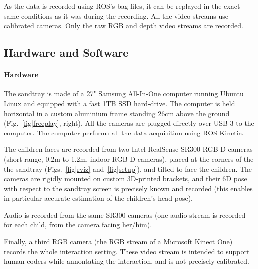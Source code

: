 \documentclass{article}
\begin{document}
As the data is recorded using ROS's bag files, it can be replayed in the exact
same conditions as it was during the recording. All the video streams use
calibrated cameras. Only the raw RGB and depth video streams are recorded. 

\subsection{Hardware and Software}

\paragraph{Hardware}
The sandtray is made of a 27" Samsung All-In-One computer running Ubuntu Linux
and equipped with a fast 1TB SSD hard-drive. The computer is held horizontal in
a custom aluminium frame standing 26cm above the ground
(Fig.~\ref{fig|freeplay}, right). All the cameras are plugged directly over
USB-3 to the computer. The computer performs all the data acquisition using ROS
Kinetic.

The children faces are recorded from two Intel RealSense SR300 RGB-D cameras
(short range, 0.2m to 1.2m, indoor RGB-D cameras), placed at the corners of the
the sandtray (Figs.~\ref{fig|rviz} and~\ref{fig|setup}), and tilted to face the
children. The cameras are rigidly mounted on custom 3D-printed brackets, and
their 6D pose with respect to the sandtray screen is precisely known and
recorded (this enables in particular accurate estimation of the children's head
pose).

Audio is recorded from the same SR300 cameras (one audio stream is recorded for
each child, from the camera facing her/him).

Finally, a third RGB camera (the RGB stream of a Microsoft Kinect One) records
the whole interaction setting. These video stream is intended to support human
coders while annontating the interaction, and is not precisely calibrated.
\end{document}

